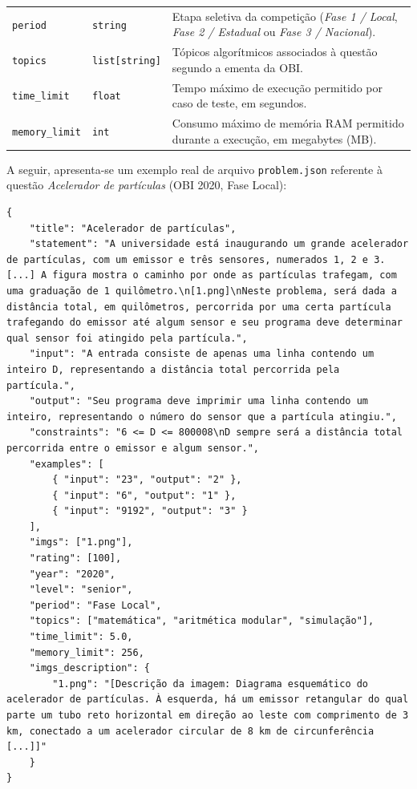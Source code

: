 \begin{table}[!htbp]
{\begin{tabular}{@{}llp{9.4cm}@{}}
\texttt{period}            & \texttt{string}         & \raggedright\arraybackslash Etapa seletiva da competição (\textit{Fase 1 / Local}, \textit{Fase 2 / Estadual} ou \textit{Fase 3 / Nacional}). \\
\texttt{topics}            & \texttt{list[string]}   & \raggedright\arraybackslash Tópicos algorítmicos associados à questão segundo a ementa da OBI. \\
\texttt{time\_limit}       & \texttt{float}          & \raggedright\arraybackslash Tempo máximo de execução permitido por caso de teste, em segundos. \\
\texttt{memory\_limit}     & \texttt{int}            & \raggedright\arraybackslash Consumo máximo de memória RAM permitido durante a execução, em megabytes (MB). \\
\bottomrule
\end{tabular}%
}
\end{table}
\FloatBarrier

A seguir, apresenta-se um exemplo real de arquivo \texttt{problem.json} referente à questão \textit{Acelerador de partículas} (OBI 2020, Fase Local):

\begin{small}
\begin{Verbatim}[samepage=true, breaklines, breakanywhere, fontsize=\footnotesize, frame=single, framesep=2mm, rulecolor=\color{black!40}]
{
    "title": "Acelerador de partículas",
    "statement": "A universidade está inaugurando um grande acelerador de partículas, com um emissor e três sensores, numerados 1, 2 e 3. [...] A figura mostra o caminho por onde as partículas trafegam, com uma graduação de 1 quilômetro.\n[1.png]\nNeste problema, será dada a distância total, em quilômetros, percorrida por uma certa partícula trafegando do emissor até algum sensor e seu programa deve determinar qual sensor foi atingido pela partícula.",
    "input": "A entrada consiste de apenas uma linha contendo um inteiro D, representando a distância total percorrida pela partícula.",
    "output": "Seu programa deve imprimir uma linha contendo um inteiro, representando o número do sensor que a partícula atingiu.",
    "constraints": "6 <= D <= 800008\nD sempre será a distância total percorrida entre o emissor e algum sensor.",
    "examples": [
        { "input": "23", "output": "2" },
        { "input": "6", "output": "1" },
        { "input": "9192", "output": "3" }
    ],
    "imgs": ["1.png"],
    "rating": [100],
    "year": "2020",
    "level": "senior",
    "period": "Fase Local",
    "topics": ["matemática", "aritmética modular", "simulação"],
    "time_limit": 5.0,
    "memory_limit": 256,
    "imgs_description": {
        "1.png": "[Descrição da imagem: Diagrama esquemático do acelerador de partículas. À esquerda, há um emissor retangular do qual parte um tubo reto horizontal em direção ao leste com comprimento de 3 km, conectado a um acelerador circular de 8 km de circunferência [...]]"
    }
}
\end{Verbatim}
\end{small}

